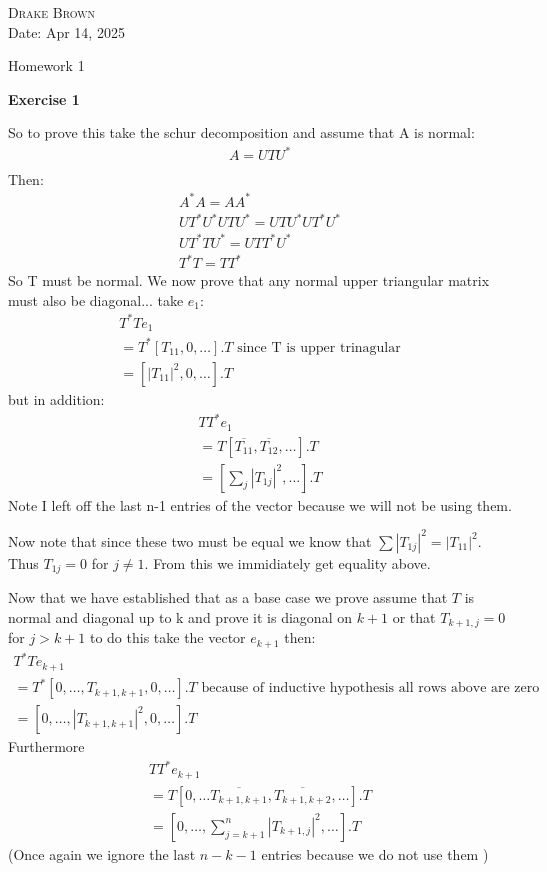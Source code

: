\documentclass[12pt]{article}
\newenvironment{exercise}[1]{\vspace{.1in}\noindent\textbf{Exercise #1 \hspace{.05em}}}{}
\theoremstyle{definition}
\theoremstyle{remark}
\begin{document}
\begin{flushright}
	\textsc{Drake Brown}  \\
	Date: Apr 14, 2025
\end{flushright}
\begin{center}
	Homework 1
\end{center}

\begin{exercise}{1}

	So to prove this take the schur decomposition and assume that A is normal:
	\begin{align}
		A=UTU^* \\
	\end{align}
	Then:
	\begin{align}
		A^*A=AA^*                 \\
		UT^*U^*UTU^*=UTU^*UT^*U^* \\
		UT^*TU^*=UTT^*U^*         \\
		T^*T=TT^*
	\end{align}
	So T must be normal. We now prove that any normal upper triangular matrix must also be diagonal...
	take $e_1$:
	\begin{align}
		T^*Te_1                                                   \\
		=T^*[T_{11},0,\dots].T\text{ since T is upper trinagular} \\
		=[|T_{11}|^2,0,\dots].T
	\end{align}
	but in addition:
	\begin{align}
		TT^*e_1                                           \\
		=T[ \overline{T_{11}}, \overline{T_{12}},\dots].T \\
		=[\sum_j |T_{1j}|^2,\dots].T
	\end{align}
	Note I left off the last n-1 entries of the vector because we will not be using them.

	Now note that since these two must be equal we know that $\sum |T_{1j}|^2=|T_{11}|^2$. Thus $T_{1j}=0$ for $j\neq 1$. From this we immidiately get equality above.

	Now that we have established that as a base case we prove assume that $T$ is normal and diagonal up to k and prove it is diagonal on $k+1$ or that $T_{k+1,j}=0$ for $j>k+1$ to do this take the vector $e_{k+1}$ then:
	\begin{align}
		T^*Te_{k+1}                                                                                         \\
		=T^*[0,\dots,T_{k+1,k+1},0,\dots].T \text{ because of inductive hypothesis all rows above are zero} \\
		=[0,\dots, |T_{k+1,k+1}|^2,0,\dots].T
	\end{align}
	Furthermore
	\begin{align}
		TT^*e_{k+1}                                                        \\
		=T[0,\dots \overline{T_{k+1,k+1}}, \overline{T_{k+1,k+2}},\dots].T \\
		=[0,\dots, \sum_{j=k+1}^n|T_{k+1,j}|^2,\dots].T
	\end{align}
	(Once again we ignore the last $n-k-1$ entries because we do not use them )


\end{exercise}
\end{document}

